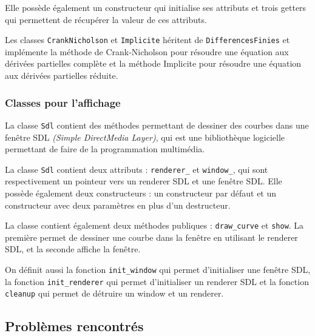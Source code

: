 \documentclass[11pt,a4paper]{article}
\begin{document}
Elle possède également un constructeur qui initialise ses attributs et trois getters qui permettent de récupérer la valeur de ces attributs.

\vspace{0.5cm}

Les classes \verb|CrankNicholson| et \verb|Implicite| héritent de \verb|DifferencesFinies| et implémente la méthode de Crank-Nicholson pour résoudre une équation aux dérivées partielles complète et la méthode Implicite pour résoudre une équation aux dérivées partielles réduite.

\vspace{0.5cm}

\subsubsection{Classes pour l'affichage}

La classe \verb|Sdl| contient des méthodes permettant de dessiner des courbes dans une fenêtre SDL \emph{(Simple DirectMedia Layer)}, qui est une bibliothèque logicielle permettant de faire de la programmation multimédia.

\vspace{0.5cm}

La classe \verb|Sdl| contient deux attributs : \verb|renderer_| et \verb|window_|, qui sont respectivement un pointeur vers un renderer SDL et une fenêtre SDL. Elle possède également deux constructeurs : un constructeur par défaut et un constructeur avec deux paramètres en plus d'un destructeur.

\vspace{0.5cm}

La classe contient également deux méthodes publiques : \verb|draw_curve| et \verb|show|. La première permet de dessiner une courbe dans la fenêtre en utilisant le renderer SDL, et la seconde affiche la fenêtre.

\vspace{0.5cm}

On définit aussi la fonction \verb|init_window| qui permet d'initialiser une fenêtre SDL, la fonction \verb|init_renderer| qui permet d'initialiser un renderer SDL et la fonction \verb|cleanup| qui permet de détruire un window et un renderer.

\newpage

\subsection{Problèmes rencontrés}
\end{document}
